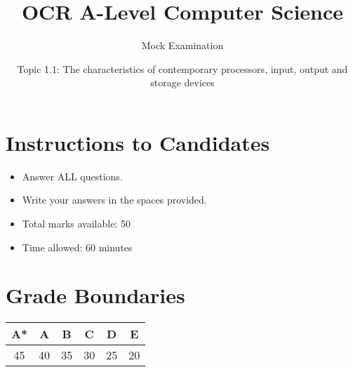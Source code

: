 \documentclass{article}
\title{OCR A-Level Computer Science}
\author{Mock Examination}
\date{Topic 1.1: The characteristics of contemporary processors, input, output and storage devices}
\begin{document}
\maketitle

\section*{Instructions to Candidates}
\begin{itemize}
    \item Answer ALL questions.
    \item Write your answers in the spaces provided.
    \item Total marks available: 50
    \item Time allowed: 60 minutes
\end{itemize}

\section*{Grade Boundaries}
\begin{center}
\begin{tabular}{|c|c|c|c|c|c|}
\hline
A* & A & B & C & D & E \\
\hline
45 & 40 & 35 & 30 & 25 & 20 \\
\hline
\end{tabular}
\end{center}

\vspace{1cm}
\end{document}
